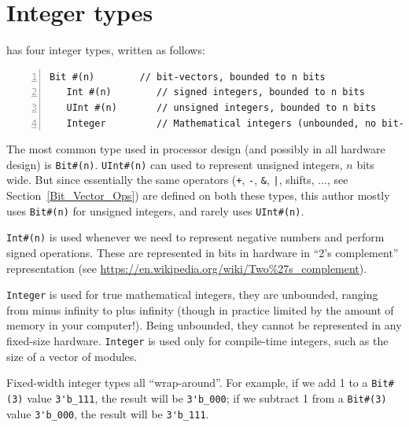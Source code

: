 
\section{Integer types}

\label{BSV_ints}


{\BSV} has four integer types, written as follows:

{\footnotesize
\begin{Verbatim}[frame=single, numbers=left]
   Bit #(n)        // bit-vectors, bounded to n bits
   Int #(n)        // signed integers, bounded to n bits
   UInt #(n)       // unsigned integers, bounded to n bits
   Integer         // Mathematical integers (unbounded, no bit-width limit)
\end{Verbatim}
}

The most common type used in processor design (and possibly in all
hardware design) is \verb|Bit#(n)|.  \verb|UInt#(n)| can used to
represent unsigned integers, $n$ bits wide.  But since essentially the
same operators (\verb|+|, \verb|-|, \verb|&|, \verb'|', shifts, ...,
see Section~\ref{Bit_Vector_Ops}) are defined on both these types,
this author mostly uses \verb|Bit#(n)| for unsigned integers, and
rarely uses \verb|UInt#(n)|.

\verb|Int#(n)| is used whenever we need to represent negative numbers
and perform signed operations.  These are represented in bits in
hardware in ``2's complement'' representation (see
\url{https://en.wikipedia.org/wiki/Two%27s_complement}).

\verb|Integer| is used for true mathematical integers, {\ie} they are
unbounded, ranging from minus infinity to plus infinity (though in
practice limited by the amount of memory in your computer!).  Being
unbounded, they cannot be represented in any fixed-size hardware.
\verb|Integer| is used only for compile-time integers, such as the
size of a vector of modules.


Fixed-width integer types all ``wrap-around''.  For example, if we add
1 to a \verb|Bit#(3)| value \verb|3'b_111|, the result will be
\verb|3'b_000|; if we subtract 1 from a \verb|Bit#(3)| value
\verb|3'b_000|, the result will be \verb|3'b_111|.

